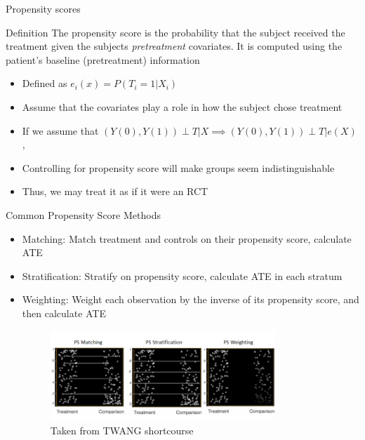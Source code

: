\begin{frame}{Propensity scores}
\begin{block}{Definition}
The propensity score is the probability that the subject received the treatment given the subjects \textit{pretreatment}
covariates. It is computed using the patient's baseline (pretreatment) information \cite{Rosenbaum1983}
\end{block}
 \begin{itemize}
  \item Defined as  $e_i(x)=P(T_i =1 |X_i)$
  \item Assume that the covariates play a role in how the subject chose treatment
  \item If we assume that $(Y(0),Y(1))\perp T|X \implies (Y(0),Y(1))\perp T|e(X)$, \cite{Rosenbaum1983}
  \item Controlling for propensity score will make groups seem indistinguishable
  \item Thus, we may treat it as if it were an RCT
 \end{itemize}

\end{frame}

\begin{frame}{Common Propensity Score Methods}
\begin{itemize}
 \item Matching: Match treatment and controls on their propensity score, calculate ATE
 \item Stratification: Stratify on propensity score, calculate ATE in each stratum
 \item Weighting: Weight each observation by the inverse of its propensity score, and then calculate ATE
 
  \begin{figure}[h!]
  \centering
    \includegraphics[width=0.8\textwidth]{ps_examples.png}
    \caption{Taken from TWANG shortcourse \cite{Rand2015}}
\label{fig:psexamp}

\end{figure}
\end{itemize}

\end{frame}

